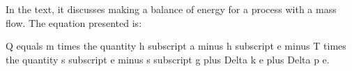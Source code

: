 In the text, it discusses making a balance of energy for a process with a mass flow. The equation presented is:

Q equals m times the quantity h subscript a minus h subscript e minus T times the quantity s subscript e minus s subscript g plus Delta k e plus Delta p e.